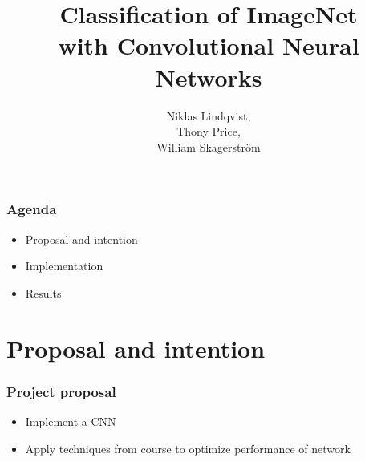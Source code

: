 \documentclass{beamer}
\title{
  Classification of ImageNet \\
  with Convolutional Neural Networks
}
\author{
  Niklas Lindqvist,\\
  Thony Price,\\
  William Skagerström\\
}
\begin{document}
\maketitle

\begin{frame}
  \frametitle{Agenda}

  \begin{itemize}
    \item Proposal and intention
    \item Implementation
    \item Results
  \end{itemize}

\end{frame}

\section{Proposal and intention}
\begin{frame}
  \frametitle{Project proposal}

  \begin{itemize}
	  \item Implement a CNN
    \item Apply techniques from course to optimize performance of network
\end{itemize}

\end{frame}
\end{document}
